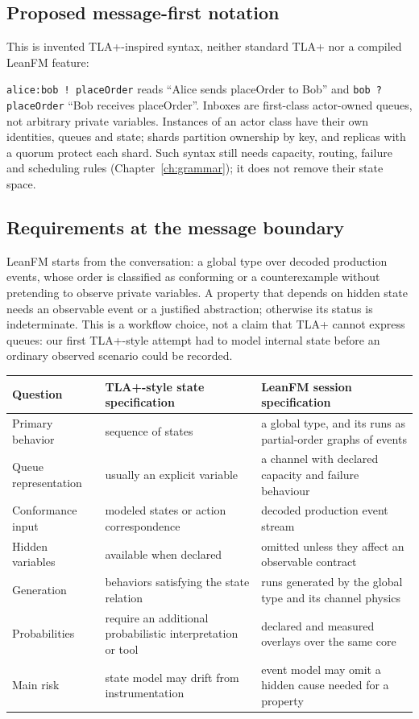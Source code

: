 \subsection{Proposed message-first notation}

This is invented TLA+-inspired syntax, neither standard TLA+ nor a compiled
LeanFM feature:



\texttt{alice:bob ! placeOrder} reads ``Alice sends placeOrder to Bob'' and
\texttt{bob ? placeOrder} ``Bob receives placeOrder''. Inboxes are first-class
actor-owned queues, not arbitrary private variables. Instances of an actor class
have their own identities, queues and state; shards partition ownership by key,
and replicas with a quorum protect each shard. Such syntax still needs capacity,
routing, failure and scheduling rules (Chapter~\ref{ch:grammar}); it does not
remove their state space.

\subsection{Requirements at the message boundary}

LeanFM starts from the conversation: a global type over decoded production
events, whose order is classified as conforming or a counterexample without
pretending to observe private variables. A property that depends on hidden state
needs an observable event or a justified abstraction; otherwise its status is
indeterminate. This is a workflow choice, not a claim that TLA+ cannot express
queues: our first TLA+-style attempt had to model internal state before an
ordinary observed scenario could be recorded.

\begin{center}
\begin{tabular}{@{}p{}p{}p{}@{}}
\toprule
Question & TLA+-style state specification & LeanFM session specification \\
\midrule
Primary behavior & sequence of states & a global type, and its runs as partial-order graphs of events \\
Queue representation & usually an explicit variable & a channel with declared capacity and failure behaviour \\
Conformance input & modeled states or action correspondence & decoded production event stream \\
Hidden variables & available when declared & omitted unless they affect an observable contract \\
Generation & behaviors satisfying the state relation & runs generated by the global type and its channel physics \\
Probabilities & require an additional probabilistic interpretation or tool & declared and measured overlays over the same core \\
Main risk & state model may drift from instrumentation & event model may omit a hidden cause needed for a property \\
\bottomrule
\end{tabular}
\end{center}

